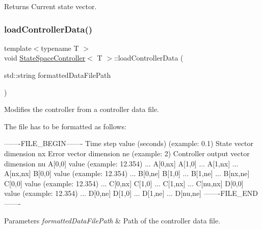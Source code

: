 \begin{DoxyReturn}{Returns}
Current state vector. 
\end{DoxyReturn}
\mbox{\label{classStateSpaceController_a6884754d53bc98c247ac4dd1f39be2ec}} 
\subsubsection{\texorpdfstring{load\+Controller\+Data()}{loadControllerData()}}
{\footnotesize\ttfamily template$<$typename T $>$ \\
void \hyperlink{classStateSpaceController}{State\+Space\+Controller}$<$ T $>$\+::load\+Controller\+Data (\begin{DoxyParamCaption}\item[{std\+::string}]{formatted\+Data\+File\+Path }\end{DoxyParamCaption})}



Modifies the controller from a controller data file. 

The file has to be formatted as follows\+: \begin{DoxyVerb}-------FILE_BEGIN-------
Time step value (seconds) (example: 0.1)
State vector dimension nx
Error vector dimension ne (example: 2)
Controller output vector dimension nu
A[0,0] value (example: 12.354)
...
A[0,nx]
A[1,0]
...
A[1,nx]
...
A[nx,nx]
B[0,0] value (example: 12.354)
...
B[0,ne]
B[1,0]
...
B[1,ne]
...
B[nx,ne]
C[0,0] value (example: 12.354)
...
C[0,nx]
C[1,0]
...
C[1,nx]
...
C[nu,nx]
D[0,0] value (example: 12.354)
...
D[0,ne]
D[1,0]
...
D[1,ne]
...
D[nu,ne]
-------FILE_END-------
\end{DoxyVerb}
 
\begin{DoxyParams}{Parameters}
{\em formatted\+Data\+File\+Path} & Path of the controller data file. \\
\hline
\end{DoxyParams}
\mbox{\label{classStateSpaceController_ade470a9ad99f273afea7b938560c4f88}} 
